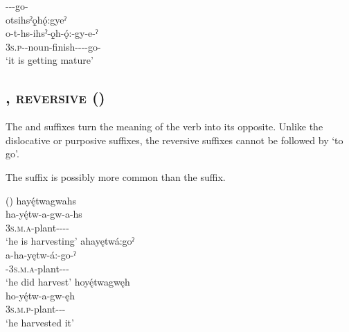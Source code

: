 \ea\label{ex:dislprogex3}  {\stative}-{\joinerA}-{\progressive}-go-\textsc{\stative}\\
otsihsˀǫ̱hǫ́:gyeˀ\\\label{ex:dislprogex3a}
\gll o-t-hs-ihsˀ-ǫ̱h-ǫ́:-gy-e-ˀ\\
 \textsc{3s.p}-{\semireflexive}-noun-finish-{\stative}-{\joinerA}-{\progressive}-go-{\stative}\\
\glt `it is getting mature'
\z


\subsection{,  \textsc{reversive} (\reversive)} \label{[-gw, -go], [-hsi] (reversives)}
The  {\reversive}  and   \textsc{\reversive} suffixes turn the meaning of the verb into its opposite. Unlike the dislocative or purposive suffixes, the reversive suffixes cannot be followed by  ‘to go’.

The  suffix is possibly more common than the  suffix.

\ea\label{ex:reverex}  (\cite{foster_course_1993})
\ea hayę́twagwahs\\
\gll ha-yę́tw-a-gw-a-hs\\
 \textsc{3s.m.a}-plant-{\joinerA}-{\reversive}-{\joinerA}-{\habitual}\\
\glt `he is harvesting'
\ex ahayętwá:goˀ\\
\gll a-ha-yętw-á:-go-ˀ\\
 {\factual}-\textsc{3s.m.a}-plant-{\joinerA}-{\reversive}-{\punctual}\\
\glt `he did harvest'
\ex hoyę́twagwęh\\
\gll ho-yę́tw-a-gw-ęh\\
 \textsc{3s.m.p}-plant-{\joinerA}-{\reversive}-{\stative}\\
\glt `he harvested it'
\z
\z

